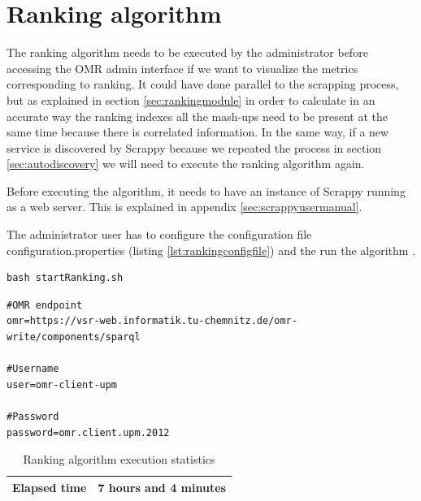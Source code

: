 



\newpage
\section{Ranking algorithm}

The ranking algorithm needs to be executed by the administrator before accessing the OMR admin interface if we want to visualize the metrics corresponding to ranking. It could have done parallel to the scrapping process, but as explained in section \ref{sec:rankingmodule} in order to calculate in an accurate way the ranking indexes all the mash-ups need to be present at the same time because there is correlated information. In the same way, if a new service is discovered by Scrappy because we repeated the process  in section \ref{sec:autodiscovery} we will need to execute the ranking algorithm again.

Before executing the algorithm, it needs to have an instance of Scrappy running as a web server. This is explained in appendix \ref{sec:scrappyusermanual}.

The administrator user has to configure the configuration file configuration.properties (listing \ref{lst:rankingconfigfile}) and the run the algorithm .

\begin{lstlisting}[style=consola,label={lst:runranking}]
bash startRanking.sh
\end{lstlisting}


\begin{lstlisting}[style=consola, label={lst:rankingconfigfile},caption={Ranking algorithm configuration file}]
#OMR endpoint
omr=https://vsr-web.informatik.tu-chemnitz.de/omr-write/components/sparql

#Username
user=omr-client-upm

#Password
password=omr.client.upm.2012
\end{lstlisting}

\begin {table}[h]
\caption {Ranking algorithm execution statistics} \label{tab:rankingelapsedtime} 
\begin{center}
	\begin{tabular}{|c|c|}
		\hline \textbf{Elapsed time}                 	   & 7 hours and 4 minutes          \\ 
		\hline 
	\end{tabular} 
\end{center}
\end{table}

